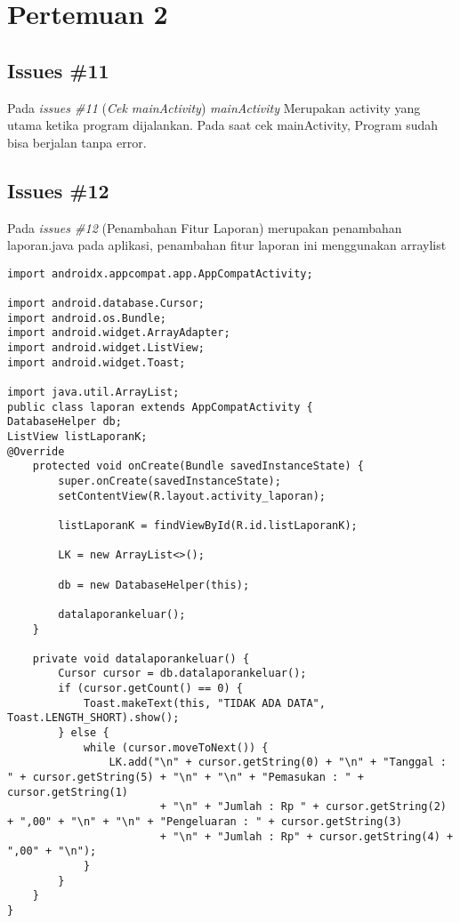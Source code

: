 \chapter{Pertemuan 2}

\section{Issues \#11}
Pada \textit{issues \#11} (\textit{Cek mainActivity}) \textit{mainActivity} 
Merupakan activity yang utama ketika program dijalankan. Pada saat cek mainActivity, Program sudah bisa berjalan tanpa error.


\section{Issues \#12}
Pada \textit{issues \#12} (Penambahan Fitur Laporan) merupakan penambahan laporan.java pada aplikasi, penambahan fitur laporan ini menggunakan arraylist
\begin{verbatim}
import androidx.appcompat.app.AppCompatActivity;

import android.database.Cursor;
import android.os.Bundle;
import android.widget.ArrayAdapter;
import android.widget.ListView;
import android.widget.Toast;

import java.util.ArrayList;
public class laporan extends AppCompatActivity { 
DatabaseHelper db;
ListView listLaporanK;
@Override
    protected void onCreate(Bundle savedInstanceState) {
        super.onCreate(savedInstanceState);
        setContentView(R.layout.activity_laporan);
            
        listLaporanK = findViewById(R.id.listLaporanK);
            
        LK = new ArrayList<>();
            
        db = new DatabaseHelper(this);
            
        datalaporankeluar();
    }
        
    private void datalaporankeluar() {
        Cursor cursor = db.datalaporankeluar();
        if (cursor.getCount() == 0) {
            Toast.makeText(this, "TIDAK ADA DATA", Toast.LENGTH_SHORT).show();
        } else {
            while (cursor.moveToNext()) {
                LK.add("\n" + cursor.getString(0) + "\n" + "Tanggal : " + cursor.getString(5) + "\n" + "\n" + "Pemasukan : " + cursor.getString(1)
                        + "\n" + "Jumlah : Rp " + cursor.getString(2) + ",00" + "\n" + "\n" + "Pengeluaran : " + cursor.getString(3)
                        + "\n" + "Jumlah : Rp" + cursor.getString(4) + ",00" + "\n");
            }
        }
    }
}
\end{verbatim}


